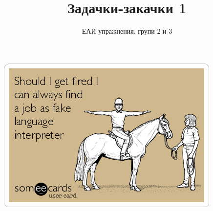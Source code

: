 \documentclass[a4paper]{scrartcl}
\title{Задачки-закачки 1}
\subtitle{ЕАИ-упражнения, групи 2 и 3}
\begin{document}
\maketitle

\centerline{\includegraphics[scale=0.5]{eai}}
\end{document}
